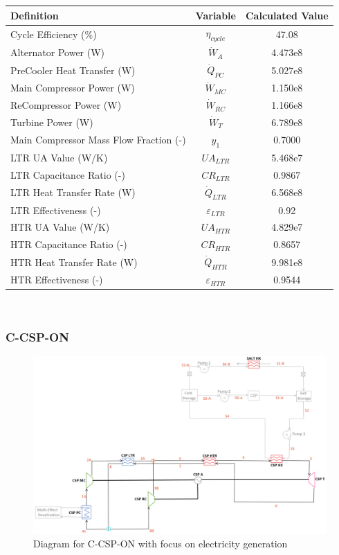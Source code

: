 \begin{paracol}{2}
\begin{specialtable}[H]
\begin{tabular}{lcc}
    \toprule
    \textbf{Definition} & \textbf{Variable} & \textbf{Calculated Value}\\
    \midrule
    Cycle Efficiency (\%) & $\eta_{cycle}$ & 47.08\\
    Alternator Power (W) & $\dot{W}_{A}$ & 4.473e8\\ 
    PreCooler Heat Transfer (W) & $\dot{Q}_{PC}$ & 5.027e8\\
    Main Compressor Power (W) & $\dot{W}_{MC}$ & 1.150e8\\ 
    ReCompressor Power (W) & $\dot{W}_{RC}$ & 1.166e8\\ 
    Turbine Power (W) & $\dot{W}_{T}$ & 6.789e8\\
    Main Compressor Mass Flow Fraction (-) & $y_{1}$ & 0.7000\\
    LTR UA Value (W/K) & $UA_{LTR}$ & 5.468e7\\
    LTR Capacitance Ratio (-) & $CR_{LTR}$ & 0.9867\\
    LTR Heat Transfer Rate (W) & $\dot{Q}_{LTR}$ & 6.568e8\\
    LTR Effectiveness (-) & $\varepsilon_{LTR}$ & 0.92\\
    HTR UA Value (W/K) & $UA_{HTR}$ & 4.829e7\\
    HTR Capacitance Ratio (-) & $CR_{HTR}$ & 0.8657\\
    HTR Heat Transfer Rate (W) & $\dot{Q}_{HTR}$ & 9.981e8\\
    HTR Effectiveness (-) & $\varepsilon_{HTR}$ & 0.9544\\
    \bottomrule
    \end{tabular}\\
\end{specialtable}

\subsubsection{C-CSP-ON} %
\end{paracol}
\begin{figure}[H]
    \widefigure
    \includegraphics[width=\linewidth]{Definitions/c-csp-on.pdf}
    \caption{Diagram for C-CSP-ON with focus on electricity generation\label{c-csp-on}}
\end{figure}
